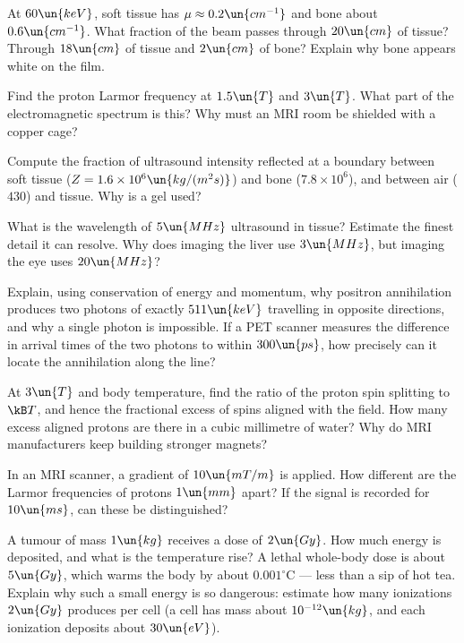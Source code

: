 \begin{problems}
\core At $60\un{keV}$, soft tissue has $\mu\approx0.2\un{cm^{-1}}$ and bone about $0.6\un{cm^{-1}}$. What fraction of the beam passes through $20\un{cm}$ of tissue? Through $18\un{cm}$ of tissue and $2\un{cm}$ of bone? Explain why bone appears white on the film.

\core Find the proton Larmor frequency at $1.5\un{T}$ and $3\un{T}$. What part of the electromagnetic spectrum is this? Why must an MRI room be shielded with a copper cage?

\core Compute the fraction of ultrasound intensity reflected at a boundary between soft tissue ($Z = 1.6\times10^{6}\un{kg/(m^2s)}$) and bone ($7.8\times10^{6}$), and between air ($430$) and tissue. Why is a gel used?

 What is the wavelength of $5\un{MHz}$ ultrasound in tissue? Estimate the finest detail it can resolve. Why does imaging the liver use $3\un{MHz}$, but imaging the eye uses $20\un{MHz}$?

 Explain, using conservation of energy and momentum, why positron annihilation produces two photons of exactly $511\un{keV}$ travelling in opposite directions, and why a single photon is impossible. If a PET scanner measures the difference in arrival times of the two photons to within $300\un{ps}$, how precisely can it locate the annihilation along the line?

 \label{prob:mri-polarization} At $3\un{T}$ and body temperature, find the ratio of the proton spin splitting to $\kB T$, and hence the fractional excess of spins aligned with the field. How many excess aligned protons are there in a cubic millimetre of water? Why do MRI manufacturers keep building stronger magnets?

 In an MRI scanner, a gradient of $10\un{mT/m}$ is applied. How different are the Larmor frequencies of protons $1\un{mm}$ apart? If the signal is recorded for $10\un{ms}$, can these be distinguished?

\core \label{prob:dose} A tumour of mass $1\un{kg}$ receives a dose of $2\un{Gy}$. How much energy is deposited, and what is the temperature rise? A lethal whole-body dose is about $5\un{Gy}$, which warms the body by about $0.001^\circ\text{C}$ --- less than a sip of hot tea. Explain why such a small energy is so dangerous: estimate how many ionizations $2\un{Gy}$ produces per cell (a cell has mass about $10^{-12}\un{kg}$, and each ionization deposits about $30\un{eV}$).


\end{problems}
